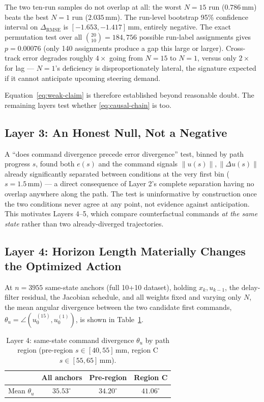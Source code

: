 \documentclass[11pt]{article}
\begin{document}
The two ten-run samples do not overlap at all: the worst $N{=}15$ run
($0.786\,\mathrm{mm}$) beats the best $N{=}1$ run
($2.035\,\mathrm{mm}$). The run-level bootstrap 95\% confidence
interval on $\Delta_{\mathrm{RMSE}}$ is $[-1.653,-1.417]\,\mathrm{mm}$,
entirely negative. The exact permutation test over all
$\binom{20}{10}=184{,}756$ possible run-label assignments gives
$p=0.00076$ (only 140 assignments produce a gap this large or
larger). Cross-track error degrades roughly $4\times$ going from
$N{=}15$ to $N{=}1$, versus only $2\times$ for lag --- $N{=}1$'s
deficiency is disproportionately lateral, the signature expected if
it cannot anticipate upcoming steering demand.

Equation~\eqref{eq:weak-claim} is therefore established beyond
reasonable doubt. The remaining layers test whether
\eqref{eq:causal-chain} is too.

\subsection{Layer 3: An Honest Null, Not a Negative}
\label{sec:ph-layer3}

A ``does command divergence precede error divergence'' test, binned
by path progress $s$, found both $e(s)$ and the command signals
$\|u(s)\|,\|\Delta u(s)\|$ already significantly separated between
conditions at the very first bin ($s=1.5\,\mathrm{mm}$) --- a direct
consequence of Layer 2's complete separation having no overlap
anywhere along the path. The test is uninformative by construction
once the two conditions never agree at any point, not evidence
against anticipation. This motivates Layers 4--5, which compare
counterfactual commands \emph{at the same state} rather than two
already-diverged trajectories.

\subsection{Layer 4: Horizon Length Materially Changes the Optimized Action}
\label{sec:ph-layer4}

At $n=3955$ same-state anchors (full 10+10 dataset), holding
$x_k,u_{k-1}$, the delay-filter residual, the Jacobian schedule, and
all weights fixed and varying only $N$, the mean angular divergence
between the two candidate first commands,
$\theta_u = \angle(u_0^{(15)},u_0^{(1)})$, is shown in
Table~\ref{tab:theta}.

\begin{table}[h]
\centering
\caption{Layer 4: same-state command divergence $\theta_u$ by path region (pre-region $s{\in}[40,55]\,\mathrm{mm}$, region C $s{\in}[55,65]\,\mathrm{mm}$).}
\label{tab:theta}
\begin{tabular}{@{}lccc@{}}
\toprule
 & All anchors & Pre-region & Region C \\
\midrule
Mean $\theta_u$ & $35.53^{\circ}$ & $34.20^{\circ}$ & $41.06^{\circ}$ \\
\bottomrule
\end{tabular}
\end{table}
\end{document}
